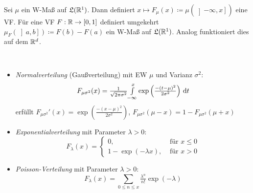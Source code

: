 \documentclass{cheat-sheet}
\newcommand{\Ring}{\mathfrak{R}} %
\newcommand{\LebAlg}{\mathfrak{L}} %
\begin{document}



\iffalse
\begin{satz}
  Sei $\Ring$ ein Ring und $\mu$ ein Inhalt. Es gelten für $n \in \N$ und $A_1, ..., A_n \in \Ring$ die Ein- und Ausschlussformeln
  \begin{align*}
    \mu(A_1 \cup ... \cup A_n) &= \sum_{k=1}^n (-1)^{k-1} \quad \sum_{\mathclap{1 \leq i_1 < ... < i_k \leq n}} \quad \mu(A_{i_1} \cap ... \cap A_{i_k}), \\
    \mu(A_1 \cap ... \cap A_n) &= \sum_{k=1}^n (-1)^{k-1} \quad \sum_{\mathclap{1 \leq i_1 < ... < i_k \leq n}} \quad \mu(A_{i_1} \cup ... \cup A_{i_k}).
  \end{align*}
\end{satz}
\fi









\begin{bem}
  Sei $\mu$ ein W-Maß auf $\LebAlg(\R^1)$. Dann definiert $x \mapsto F_{\mu}(x) \coloneqq \mu(\left] -\infty, x \right])$ eine VF. Für eine VF $F : \mathbb{R} \to [0,1]$ definiert umgekehrt $\mu_F(\left] a, b \right]) \coloneqq F(b) - F(a)$ ein W-Maß auf $\LebAlg(\R^1)$. Analog funktioniert dies auf dem $\mathbb{R}^d$.
\end{bem}


\begin{defn}\mbox{}\\
  \begin{itemize}
    \item \emph{Normalverteilung} (Gaußverteilung) mit EW $\mu$ und Varianz $\sigma^2$:
    \[ F_{\mu \sigma^2}(x) = \tfrac{1}{\sqrt{2 \pi \sigma^2}} {\textstyle \int\limits_{-\infty}^{x}} \exp\left(\tfrac{-(t-\mu)^2}{2 \sigma^2}\right) \,\mathrm{d} t \]
    erfüllt $F_{\mu \sigma^2}'(x) = \exp\left(\tfrac{-(x-\mu)^2}{2 \sigma^2}\right)$, $F_{\mu \sigma^2}(\mu-x) = 1 - F_{\mu \sigma^2}(\mu+x)$
    \item \emph{Exponentialverteilung} mit Parameter $\lambda > 0$:
    \[ F_{\lambda}(x) = \begin{cases} 0, & \text{ für } x \leq 0 \\
                                      1 - \exp(- \lambda x), & \text{ für } x > 0
    \end{cases} \]
    \item \emph{Poisson-Verteilung} mit Parameter $\lambda > 0$:
    \[ F_{\lambda}(x) = \sum_{0 \leq n \leq x} \tfrac{\lambda^n}{n!} \exp(-\lambda) \]
  \end{itemize}
\end{defn}
\end{document}
